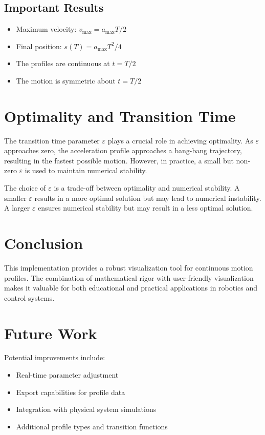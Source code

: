 \documentclass[12pt,a4paper]{article}
\begin{document}
\subsection{Important Results}
\begin{itemize}
\item Maximum velocity: $v_{\text{max}} = a_{\text{max}}T/2$
\item Final position: $s(T) = a_{\text{max}}T^2/4$
\item The profiles are continuous at $t = T/2$
\item The motion is symmetric about $t = T/2$
\end{itemize}

\section{Optimality and Transition Time}

The transition time parameter $\varepsilon$ plays a crucial role in achieving optimality. As $\varepsilon$ approaches zero, the acceleration profile approaches a bang-bang trajectory, resulting in the fastest possible motion. However, in practice, a small but non-zero $\varepsilon$ is used to maintain numerical stability.

The choice of $\varepsilon$ is a trade-off between optimality and numerical stability. A smaller $\varepsilon$ results in a more optimal solution but may lead to numerical instability. A larger $\varepsilon$ ensures numerical stability but may result in a less optimal solution.

\section{Conclusion}
This implementation provides a robust visualization tool for continuous motion profiles. The combination of mathematical rigor with user-friendly visualization makes it valuable for both educational and practical applications in robotics and control systems.

\section{Future Work}
Potential improvements include:
\begin{itemize}
\item Real-time parameter adjustment
\item Export capabilities for profile data
\item Integration with physical system simulations
\item Additional profile types and transition functions
\end{itemize}
\end{document}
